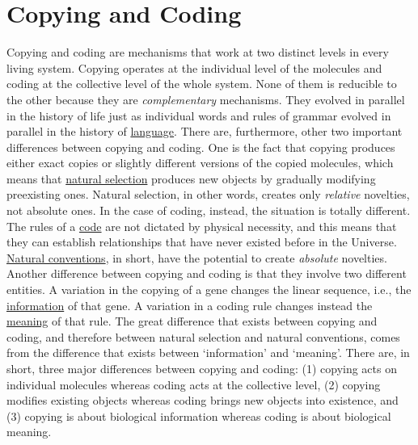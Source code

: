\documentclass[12pt]{article}
\begin{document}
\section{Copying and Coding}
Copying and coding are mechanisms that work at two distinct levels in every living system. Copying operates at the individual level of the molecules and coding at the collective level of the whole system. None of them is reducible to the other because they are \textit{complementary} mechanisms. They evolved in parallel in the history of life just as individual words and rules of grammar evolved in parallel in the history of \hyperlink{language}{language}. There are, furthermore, other two important differences between copying and coding. One is the fact that copying produces either exact copies or slightly different versions of the copied molecules, which means that \hyperlink{natural_selection}{natural selection} produces new objects by gradually modifying preexisting ones. Natural selection, in other words, creates only \textit{relative} novelties, not absolute ones. In the case of coding, instead, the situation is totally different. The rules of a \hyperlink{code}{code} are not dictated by physical necessity, and this means that they can establish relationships that have never existed before in the Universe. \hyperlink{natural_conventions}{Natural conventions}, in short, have the potential to create \textit{absolute} novelties. Another difference between copying and coding is that they involve two different entities. A variation in the copying of a gene changes the linear sequence, i.e., the \hyperlink{organic_information}{information} of that gene. A variation in a coding rule changes instead the \hyperlink{meaning}{meaning} of that rule. The great difference that exists between copying and coding, and therefore between natural selection and natural conventions, comes from the difference that exists between `information' and `meaning'. There are, in short, three major differences between copying and coding: (1) copying acts on individual molecules whereas coding acts at the collective level, (2) copying modifies existing objects whereas coding brings new objects into existence, and (3) copying is about biological information whereas coding is about biological meaning. 


\hypertarget{copying_semiosis}{}
\end{document}
